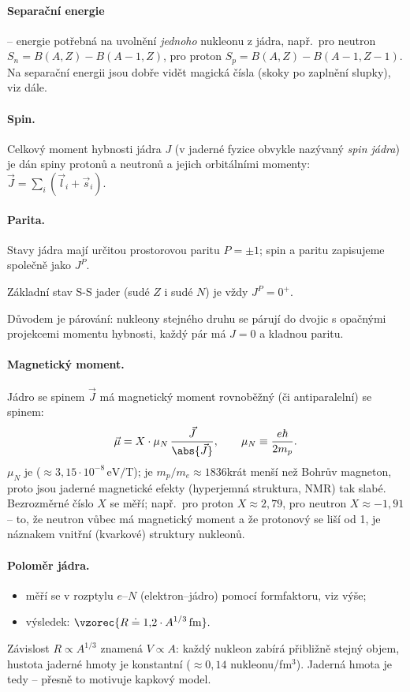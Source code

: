 \paragraph{Separační energie} -- energie potřebná na uvolnění \emph{jednoho}
nukleonu z jádra, např.\ pro neutron
\(S_n = B(A,Z) - B(A-1,Z)\), pro proton \(S_p = B(A,Z) - B(A-1,Z-1)\). Na
separační energii jsou dobře vidět magická čísla (skoky po zaplnění
slupky), viz dále.

\paragraph{Spin.} Celkový moment hybnosti jádra \(J\) (v jaderné fyzice
obvykle nazývaný \emph{spin jádra}) je dán spiny protonů a neutronů
a jejich orbitálními momenty: \(\vec J = \sum_i(\vec l_i + \vec s_i)\).

\paragraph{Parita.} Stavy jádra mají určitou prostorovou paritu \(P=\pm1\);
spin a paritu zapisujeme společně jako \(J^P\).
\begin{veta}
Základní stav S-S jader (sudé \(Z\) i sudé \(N\)) je vždy \(J^P = 0^+\).
\end{veta}
Důvodem je párování: nukleony stejného druhu se párují do dvojic s opačnými
projekcemi momentu hybnosti, každý pár má \(J=0\) a kladnou paritu.

\paragraph{Magnetický moment.} Jádro se spinem \(\vec J\) má magnetický
moment rovnoběžný (či antiparalelní) se spinem:
\[
  \vec\mu = X\cdot\mu_N\,\frac{\vec J}{\abs{\vec J}},
  \qquad
  \mu_N \equiv \frac{e\hbar}{2m_p} .
\]
\(\mu_N\) je  (\(\approx 3{,}15\cdot10^{-8}\,
\mathrm{eV/T}\)); je \(m_p/m_e\approx1836\)krát menší než Bohrův magneton,
proto jsou jaderné magnetické efekty (hyperjemná struktura, NMR) tak slabé.
Bezrozměrné číslo \(X\) se měří; např.\ pro proton \(X\approx 2{,}79\), pro
neutron \(X\approx -1{,}91\) -- to, že neutron vůbec má magnetický moment
a že protonový se liší od 1, je náznakem vnitřní (kvarkové) struktury
nukleonů.

\paragraph{Poloměr jádra.}
\begin{itemize}
  \item měří se v rozptylu \(e\)--\(N\) (elektron--jádro) pomocí formfaktoru,
    viz výše;
  \item výsledek:
  \(\displaystyle \vzorec{R \doteq 1{,}2\cdot A^{1/3}\,\mathrm{fm}} .\)
\end{itemize}
Závislost \(R\propto A^{1/3}\) znamená \(V\propto A\): každý nukleon zabírá
přibližně stejný objem, hustota jaderné hmoty je konstantní
(\(\approx 0{,}14\) nukleonu/fm\(^3\)). Jaderná hmota je tedy
 -- přesně to motivuje kapkový model.


